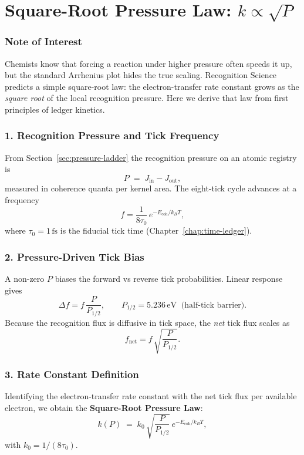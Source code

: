 \documentclass[11pt,oneside]{book}
\begin{document}
\bigskip
\section{Square-Root Pressure Law: \texorpdfstring{$k \propto \sqrt{P}$}{k ∝ √P}}
\label{sec:sqrt-pressure-law}

\subsubsection*{Note of Interest}

Chemists know that forcing a reaction under higher pressure often speeds
it up, but the standard Arrhenius plot hides the true scaling.
Recognition Science predicts a simple square-root law:
the electron-transfer rate constant grows as the \emph{square root} of the
local recognition pressure.
Here we derive that law from first principles of ledger kinetics.

\subsubsection*{1. Recognition Pressure and Tick Frequency}

From Section~\ref{sec:pressure-ladder} the recognition pressure on an
atomic registry is
\[
   P \;=\; J_{\text{in}} - J_{\text{out}},
\]
measured in coherence quanta per kernel area.
The eight-tick cycle advances at a frequency
\[
   f = \frac{1}{8\tau_0}\,e^{-E_{\text{coh}}/k_BT},
\]
where \(\tau_0 = 1\,\text{fs}\) is the fiducial tick time
(Chapter~\ref{chap:time-ledger}).

\subsubsection*{2. Pressure-Driven Tick Bias}

A non-zero \(P\) biases the forward vs reverse tick probabilities.
Linear response gives
\[
   \Delta f = f\,\frac{P}{P_{1/2}},
   \qquad
   P_{1/2}=5.236\,\text{eV}
   \;\;\text{(half-tick barrier)}.
\]
Because the recognition flux is diffusive in tick space,
the \emph{net} tick flux scales as
\[
   f_\text{net} = f\,\sqrt{\frac{P}{P_{1/2}}}.
\]

\subsubsection*{3. Rate Constant Definition}

Identifying the electron-transfer rate constant with the net tick flux
per available electron, we obtain the
\textbf{Square-Root Pressure Law}:
\[
   \boxed{\;
      k(P)
      \;=\;
      k_0\,
      \sqrt{\frac{P}{P_{1/2}}}\,
      e^{-E_{\text{coh}}/k_BT},
   \;}
\]
with \(k_0 = 1/(8\tau_0)\).
\end{document}
